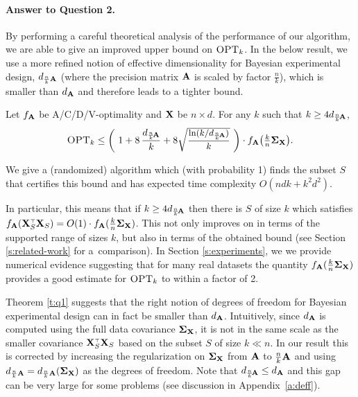 \documentclass[11pt]{article}
\begin{document}
\paragraph{Answer to Question 2.}
By performing a careful theoretical analysis of the performance of our
algorithm, we are able to give an improved upper bound on ${\textsc{OPT}_k}$. In the below
result, we use a more refined notion of effective dimensionality for
Bayesian experimental design,
$d_{\frac nk\mathbf A}$ (where the precision matrix $\mathbf A$ is scaled by factor $\frac
nk$), which is smaller than $d_\mathbf A$ and therefore leads 
to a tighter bound.
\begin{theorem}\label{t:q1}
  Let $f_{\mathbf A}$ be A/C/D/V-optimality and $\mathbf X$ be
  $n\times d$. For any $k$ such that $k\geq 4d_{\frac
    nk\!\mathbf A}$, %
  \begin{align*}
\opt    \leq \bigg(\ 1+8\,\frac{d_{\frac
    nk\!\A}}{k} + 8\sqrtshort{\frac{\ln (k/d_{\frac nk\!\A})}{k}}\
    \bigg)\cdot f_{\A}\big(\tfrac kn\Sigmab_{\X}\big).
  \end{align*}
\end{theorem}
\begin{remark}
  We give a (randomized) algorithm which (with probability 1) finds
  the subset $S$ that certifies this bound and has expected time
  complexity $O(ndk+k^2d^2)$. 
\end{remark}
  In particular, this means that if $k\geq 4d_{\frac nk\!\mathbf A}$
  then there is $S$ of size $k$
  which satisfies $f_{\A}(\X_S^\top\X_S) = O(1)\cdot f_{\A}(\frac kn\Sigmab_{\X})$.
  This not only improves on \cite{regularized-volume-sampling} in terms
  of the supported range of sizes $k$, but also in terms of the obtained bound (see
  Section \ref{s:related-work} for a~comparison). In Section
  \ref{s:experiments}, we we provide numerical evidence suggesting
  that for many real datasets the quantity $f_{\mathbf A}(\frac
  kn\mathbf{\Sigma}_{\mathbf X})$ provides a good estimate for ${\textsc{OPT}_k}$ to within a
  factor of 2.

Theorem \ref{t:q1} suggests that the right notion of degrees of
freedom for Bayesian experimental design can in fact be smaller
than $d_{\mathbf A}$.  
Intuitively, since $d_{\mathbf A}$ is computed using the full data covariance
$\mathbf{\Sigma}_{\mathbf X}$, it is not in the same scale as the smaller covariance
$\X_S^\top\X_S$ based on the subset $S$ of size $k\ll n$. In our
result this is corrected by increasing the 
regularization on $\mathbf{\Sigma}_\mathbf X$ from $\mathbf A$ to $\frac{n}{k}\mathbf A$ and using
$d_{\frac nk\mathbf A}=d_{\frac{n}{k}\mathbf A}(\mathbf{\Sigma}_\mathbf X)$ as the degrees of
freedom. 
Note that $d_{\frac nk\!\mathbf A}\leq d_{\mathbf A}$ and this gap can be very large for some
problems (see discussion in Appendix~\ref{a:deff}).
\end{document}
